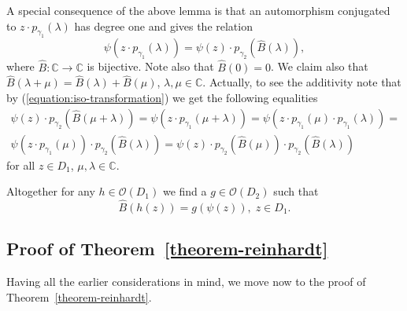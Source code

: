 \documentclass[a4paper,12pt]{amsart}
\theoremstyle{definition}
\begin{document}
A special consequence of the above lemma is that an automorphism conjugated to $z\cdot p_{\gamma_1}(\lambda)$ has degree one and gives the relation
\begin{equation}\label{equation:iso-transformation}
    \psi(z\cdot p_{\gamma_1}(\lambda))=\psi(z)\cdot p_{\gamma_2}(\widehat{B}(\lambda)),
\end{equation}
where $\widehat{B}:\mathbb C\to\mathbb C$ is bijective. Note also that $\widehat{B}(0)=0$. We claim also that $\hat B(\lambda+\mu)=\widehat{B}(\lambda)+\widehat{B}(\mu)$, $\lambda,\mu\in\mathbb C$. Actually, to see the additivity note that by (\ref{equation:iso-transformation}) we get the following equalities
\begin{multline}
\psi(z)\cdot p_{\gamma_2}(\widehat{B}(\mu+\lambda))=\psi(z\cdot p_{\gamma_1}(\mu+\lambda))=   
\psi(z\cdot p_{\gamma_1}(\mu)\cdot p_{\gamma_1}(\lambda))=\\ \psi(z\cdot p_{\gamma_1}(\mu))\cdot p_{\gamma_2}(\widehat{B}(\lambda))=\psi(z)\cdot p_{\gamma_2}(\widehat{B}(\mu))\cdot p_{\gamma_2}(\widehat{B}(\lambda))
\end{multline}
for all $z\in D_1$, $\mu,\lambda\in\mathbb C$.

Altogether for any $h\in\mathcal O(D_1)$ we find a $g\in\mathcal O(D_2)$ such that 
\begin{equation}
    \widehat{B}(h(z))=g(\psi(z)),\; z\in D_1.
\end{equation}

\subsection{Proof of Theorem~\ref{theorem-reinhardt}}
Having all the earlier considerations in mind, we move now to the proof of Theorem~\ref{theorem-reinhardt}.
\end{document}
